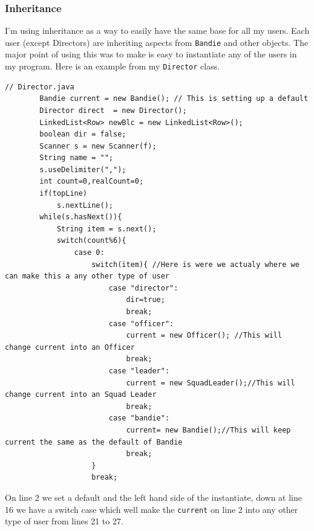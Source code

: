 \documentclass{article}
\begin{document}
\subsubsection{Inheritance}
I'm using inheritance as a way to easily have the same base for all my users. Each user (except Directors) are inheriting aspects from \verb|Bandie| and other objects. The major point of using this was to make is easy to instantiate any of the users in my program. Here is an example from my \verb|Director| class.
\newpage
\begin{lstlisting}
// Director.java
		Bandie current = new Bandie(); // This is setting up a default
		Director direct  = new Director();
		LinkedList<Row> newBlc = new LinkedList<Row>();
		boolean dir = false;
		Scanner s = new Scanner(f);
		String name = "";
		s.useDelimiter(",");
		int count=0,realCount=0;
		if(topLine)
			s.nextLine();
		while(s.hasNext()){
			String item = s.next();
			switch(count%6){
				case 0:
					switch(item){ //Here is were we actualy where we can make this a any other type of user
						case "director":
							dir=true;
							break;
						case "officer":
							current = new Officer(); //This will change current into an Officer
							break;
						case "leader":
							current = new SquadLeader();//This will change current into an Squad Leader
							break;
						case "bandie":
							current= new Bandie();//This will keep current the same as the default of Bandie
							break;
					}
					break;
\end{lstlisting}
On line 2 we set a default and the left hand side of the instantiate, down at line 16 we have a switch case which well make the \verb|current| on line 2 into any other type of user from lines 21 to 27. 
\end{document}
